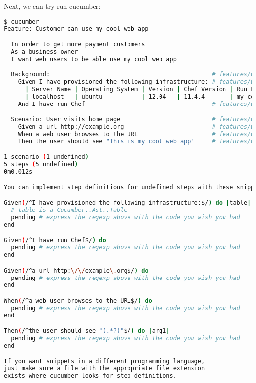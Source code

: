 Next, we can try run cucumber:

\begin{lstlisting}[language=Bash,label=lst:testing-cucumber-spec5]
$ cucumber
Feature: Customer can use my cool web app

  In order to get more payment customers
  As a business owner
  I want web users to be able use my cool web app

  Background:                                              # features/working_web_page.feature:7
    Given I have provisioned the following infrastructure: # features/working_web_page.feature:8
      | Server Name | Operating System | Version | Chef Version | Run List             |
      | localhost   | ubuntu           | 12.04   | 11.4.4       | my_cool_app::default |
    And I have run Chef                                    # features/working_web_page.feature:12

  Scenario: User visits home page                          # features/working_web_page.feature:14
    Given a url http://example.org                         # features/working_web_page.feature:15
    When a web user browses to the URL                     # features/working_web_page.feature:16
    Then the user should see "This is my cool web app"     # features/working_web_page.feature:17

1 scenario (1 undefined)
5 steps (5 undefined)
0m0.012s

You can implement step definitions for undefined steps with these snippets:

Given(/^I have provisioned the following infrastructure:$/) do |table|
  # table is a Cucumber::Ast::Table
  pending # express the regexp above with the code you wish you had
end

Given(/^I have run Chef$/) do
  pending # express the regexp above with the code you wish you had
end

Given(/^a url http:\/\/example\.org$/) do
  pending # express the regexp above with the code you wish you had
end

When(/^a web user browses to the URL$/) do
  pending # express the regexp above with the code you wish you had
end

Then(/^the user should see "(.*?)"$/) do |arg1|
  pending # express the regexp above with the code you wish you had
end

If you want snippets in a different programming language,
just make sure a file with the appropriate file extension
exists where cucumber looks for step definitions.
\end{lstlisting}

